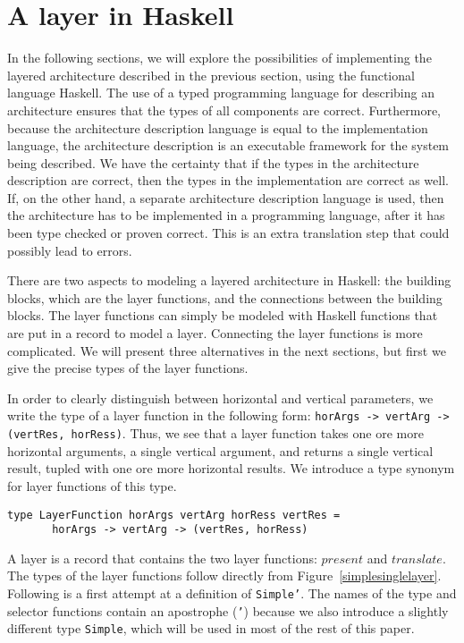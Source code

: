%									
%									
%									
\section{A layer in Haskell}

In the following sections, we will explore the possibilities of implementing the layered architecture described in the previous section, using the functional language Haskell. The use of a typed programming language for describing an architecture ensures that the types of all components are correct. Furthermore, because the architecture description language is equal to the implementation language, the architecture description is an executable framework for the system being described. We have the certainty that if the types in the architecture description are correct, then the types in the implementation are correct as well. If, on the other hand, a separate architecture description language is used, then the architecture has to be implemented in a programming language, after it has been type checked or proven correct. This is an extra translation step that could possibly lead to errors.

There are two aspects to modeling a layered architecture in Haskell: the building blocks, which are the layer functions, and the connections between the building blocks. The layer functions can simply be modeled with Haskell functions that are put in a record to model a layer. Connecting the layer functions is more complicated. We will present three alternatives in the next sections, but first we give the precise types of the layer functions. 

In order to clearly distinguish between horizontal and vertical parameters, we write the type of a layer function in the following form: \texttt{horArgs -> vertArg -> (vertRes, horRess)}. Thus, we see that a layer function takes one ore more horizontal arguments, a single vertical argument, and returns a single vertical result, tupled with one ore more horizontal results. We introduce a type synonym for layer functions of this type.

\begin{small}
\begin{verbatim}
type LayerFunction horArgs vertArg horRess vertRes =
       horArgs -> vertArg -> (vertRes, horRess)
\end{verbatim}
\end{small}

A layer is a record that contains the two layer functions: $present$ and $translate$. The types of the layer functions follow directly from Figure~\ref{simplesinglelayer}. Following is a first attempt at a definition of \texttt{Simple'}. The names of the type and selector functions contain an apostrophe (\texttt{'}) because we also introduce a slightly different type \texttt{Simple}, which will be used in most of the rest of this paper.

